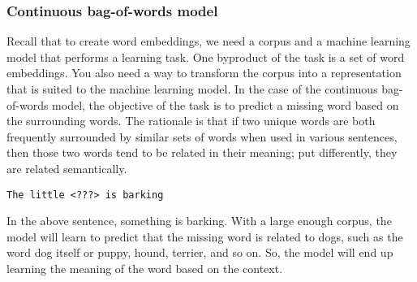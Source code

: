 \documentclass[12pt]{article}
\begin{document}
\subsubsection{Continuous bag-of-words model} Recall that to create word embeddings, we need a corpus and a machine learning model that performs a learning task. One byproduct of the task is a set of word embeddings. You also need a way to transform the corpus into a representation that is suited to the machine learning model. In the case of the continuous bag-of-words model, the objective of the task is to predict a missing word based on the surrounding words. The rationale is that if two unique words are both frequently surrounded by similar sets of words when used in various sentences, then those two words tend to be related in their meaning; put differently, they are related semantically.
\begin{verbatim}
The little <???> is barking
\end{verbatim}
In the above sentence, something is barking. With a large enough corpus, the model will learn to predict that the missing word is related to dogs, such as the word dog itself or puppy, hound, terrier, and so on. So, the model will end up learning the meaning of the word based on the context.
\end{document}
